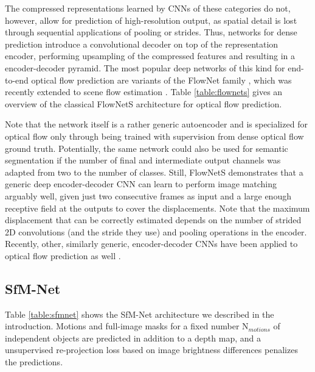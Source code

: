 The compressed representations learned by CNNs of these categories do not, however, allow
for prediction of high-resolution output, as spatial detail is lost through sequential applications
of pooling or strides.
Thus, networks for dense prediction introduce a convolutional decoder on top of the representation encoder,
performing upsampling of the compressed features and resulting in a encoder-decoder pyramid.
The most popular deep networks of this kind for end-to-end optical flow prediction
are variants of the FlowNet family \cite{FlowNet, FlowNet2},
which was recently extended to scene flow estimation \cite{SceneFlowDataset}.
Table \ref{table:flownets} gives an overview of the classical FlowNetS architecture for optical flow prediction.

Note that the network itself is a rather generic autoencoder and is specialized for optical flow only through being trained
with supervision from dense optical flow ground truth.
Potentially, the same network could also be used for semantic segmentation if
the number of final and intermediate output channels was adapted from two to the number of classes.
Still, FlowNetS demonstrates that a generic deep encoder-decoder CNN can learn to perform image matching arguably well,
given just two consecutive frames as input and a large enough receptive field at the outputs to cover the displacements.
Note that the maximum displacement that can be correctly estimated depends on the number of strided 2D convolutions (and the stride they use) and pooling
operations in the encoder.
Recently, other, similarly generic,
encoder-decoder CNNs have been applied to optical flow prediction as well \cite{DenseNetDenseFlow}.

\subsection{SfM-Net}
Table \ref{table:sfmnet} shows the SfM-Net \cite{SfmNet} architecture we described
in the introduction.
Motions and full-image masks for a fixed number N$_{motions}$ of independent objects
are predicted in addition to a depth map, and a unsupervised re-projection loss based on
image brightness differences penalizes the predictions.

